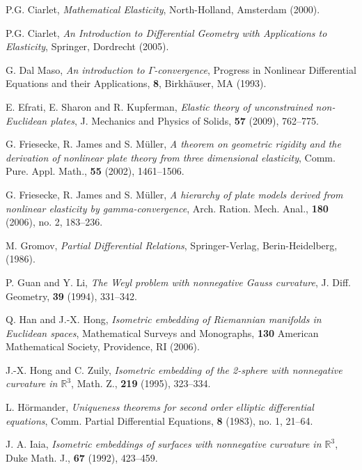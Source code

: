 \documentclass[leqno,twoside, 11pt]{amsart}
\theoremstyle{plain}
\theoremstyle{definition}
\numberwithin{equation}{section}
\numberwithin{figure}{section}
\begin{document}
\begin{thebibliography}{9999}

 P.G. Ciarlet, \textit{Mathematical Elasticity}, 
North-Holland, Amsterdam (2000).

 P.G. Ciarlet, 
\textit{An Introduction to Differential Geometry with Applications to Elasticity},
Springer, Dordrecht (2005).

 G. Dal Maso, 
\textit{An introduction to $\Gamma$-convergence}, 
Progress in Nonlinear Differential Equations and their Applications, {\bf 8}, 
Birkh\"auser, MA (1993).

 E. Efrati, E. Sharon and R. Kupferman,
\textit{Elastic theory of unconstrained non-Euclidean plates},
J. Mechanics and Physics of Solids, {\bf 57} (2009), 762--775.

 G. Friesecke, R. James and S. M\"uller, 
\textit{A theorem on geometric rigidity and the derivation of nonlinear 
plate theory from three dimensional elasticity}, Comm. Pure. Appl. Math., 
{\bf 55} (2002), 1461--1506.  

 G. Friesecke, R. James and S. M\"uller, \textit{A hierarchy 
of plate models derived from nonlinear elasticity by gamma-convergence}, 
Arch. Ration. Mech. Anal.,  {\bf 180}  (2006),  no. 2, 183--236.

 M. Gromov,
\textit{Partial Differential Relations}, Springer-Verlag, Berin-Heidelberg, (1986).

 P. Guan and Y. Li, \textit{The Weyl problem with nonnegative 
Gauss curvature}, J. Diff. Geometry, {\bf 39} (1994), 331--342.
 

 Q. Han and J.-X. Hong, \textit{Isometric embedding of Riemannian 
manifolds in Euclidean spaces}, Mathematical Surveys and Monographs, {\bf 130} 
American Mathematical Society, Providence, RI (2006).

 J.-X. Hong and  C. Zuily, \textit{Isometric embedding of the 2-sphere with 
nonnegative curvature in $\mathbb R^3$}, Math. Z., {\bf 219} (1995), 323--334. 

 L. H\"ormander, \textit{Uniqueness theorems for second order 
elliptic differential equations}, Comm. Partial Differential Equations, 
{\bf 8} (1983), no. 1, 21--64. 

 J. A. Iaia, \textit{Isometric embeddings of surfaces with nonnegative 
curvature in $\mathbb R^3$}, Duke  Math. J., {\bf 67} (1992), 423--459.


\end{thebibliography}
\end{document}
